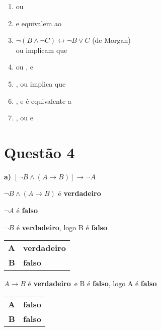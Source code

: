 \begin{enumerate}[wide, labelindent=0pt, label=\textbf{\alph*)}]
    \item \fB ou \fnc
    \item \fC e \fna equivalem ao \fb
    \item $\neg (B \wedge \neg C) \leftrightarrow
    \neg B \vee C$ (de Morgan)\\
         \indent \fnB ou \fc implicam que \fa
    \item \fA ou \fb, e \fnc
    \item \fnB, ou \fa implica que \fc
    \item \fC, e \fna é equivalente a \fb
    \item \fA, ou \fb e \fnc
\end{enumerate}

\section*{Questão 4}

\newcommand\vv{\textbf{verdadeiro}}
\newcommand\ff{\textbf{falso}}

\noindent
\textbf{a)} $[\neg B \wedge (A \rightarrow B)] \rightarrow \neg A$

\medskip
\noindent
$\neg B \wedge (A \rightarrow B)$ é \vv

\noindent
$\neg A$ é \ff

\medskip
\noindent
\dotfill
\medskip

\noindent
$\neg B$ é \vv, logo B é \ff

\medskip
\begin{tabular}{|r l|}
\hline
    \textbf{A} & \vv \\
    \textbf{B} & \ff \\
\hline
\end{tabular}

\medskip
\noindent
\dotfill
\medskip

\noindent
$A \rightarrow B$ é \vv\ e B é \ff, logo A é \ff

\medskip
\begin{tabular}{|r l|}
\hline
    \textbf{A} & \ff \\
    \textbf{B} & \ff \\
\hline
\end{tabular}

\medskip
\noindent
\dotfill
\medskip

